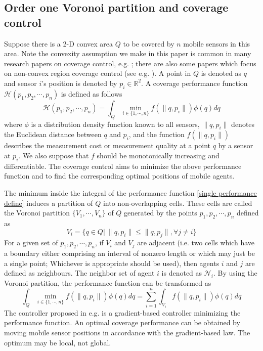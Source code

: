 \documentclass[letterpaper, 10 pt, conference]{ieeeconf}
\begin{document}
\subsection{Order one Voronoi partition and coverage control}
\label{Background}
Suppose there is a 2-D convex area $Q$ to be covered by $n$ mobile sensors in this area. Note the convexity assumption we make in this paper is common in many research papers on coverage control, e.g. \cite{cortes2004coverage, schwager2009decentralized}; there are also some papers which focus on non-convex region coverage control (see e.g. \cite{breitenmoser2010voronoi}). A point in $Q$ is denoted as $q$ and sensor $i$'s position is denoted by $p_i \in \mathbb{R}^2$. A coverage performance function $\mathcal{H}(p_1, p_2,\cdots,p_n)$ is defined as follows
\begin{equation}
\label{single performance define}
\mathcal{H}(p_1, p_2,\cdots,p_n)=\int_Q \min_{i\in \{1,\cdots,n\}} f(\|q,p_i\|) \phi(q)dq
\end{equation}
where $\phi$ is a distribution density function known to all sensors, $\|q,p_i\|$ denotes the Euclidean distance between $q$ and $p_i$, and
the function $f(\|q,p_i\|)$ describes the measurement cost or measurement quality at a point $q$ by a sensor at $p_i$. We also suppose that $f$ should be monotonically increasing and differentiable. The coverage control aims to  minimize the above performance function and to find the corresponding optimal positions of mobile agents.

The minimum inside the integral of the performance function \eqref{single performance define} induces a partition of $Q$ into non-overlapping cells. These cells   are called the Voronoi partition $\{V_1,\cdots,V_n\}$ of $Q$ generated by the points $p_1, p_2,\cdots,p_n$ defined as
\begin{equation}
V_i=\{q\in Q | ~\| q,p_i\| \leq \| q,p_j\|,\forall j\neq i\}
\end{equation}
For a given set of $p_1, p_2,\cdots,p_n$, if $V_i$ and $V_j$ are adjacent (i.e. two cells which have a boundary either comprising an interval of nonzero length or which may just be a single point; Whichever is appropriate should be used), then agents  $i$ and  $j$ are defined as neighbours. The neighbor set of agent $i$ is denoted as $\mathcal{N}_i$.
By using the Voronoi partition, the performance function can be transformed as
\begin{equation}
\int_Q \min_{i\in \{1,\cdots,n\}} f(\|q,p_i\|) \phi(q)dq=\sum_{i=1}^n \int_{V_i} f(\|q,p_i\|) \phi(q)dq
\end{equation}
The controller proposed in e.g. \cite{cortes2004coverage} is a gradient-based controller minimizing the performance function. An optimal coverage performance can be obtained by moving mobile sensor positions in accordance with the gradient-based law. The optimum may be local, not global.
\end{document}
